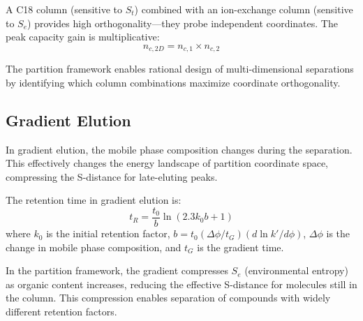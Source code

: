 \documentclass[twocolumn,superscriptaddress,prb,10pt]{revtex4-2}
\begin{document}
A C18 column (sensitive to $S_t$) combined with an ion-exchange column (sensitive to $S_e$) provides high orthogonality—they probe independent coordinates. The peak capacity gain is multiplicative:
\begin{equation}
n_{c,2D} = n_{c,1} \times n_{c,2}
\label{eq:peak_capacity_2d}
\end{equation}

The partition framework enables rational design of multi-dimensional separations by identifying which column combinations maximize coordinate orthogonality.

\subsection{Gradient Elution}

In gradient elution, the mobile phase composition changes during the separation. This effectively changes the energy landscape of partition coordinate space, compressing the S-distance for late-eluting peaks.

The retention time in gradient elution is:
\begin{equation}
t_R = \frac{t_0}{b} \ln\left(2.3 k_0 b + 1\right)
\label{eq:gradient_retention}
\end{equation}
where $k_0$ is the initial retention factor, $b = t_0 (\Delta\phi / t_G)(d\ln k' / d\phi)$, $\Delta\phi$ is the change in mobile phase composition, and $t_G$ is the gradient time.

In the partition framework, the gradient compresses $S_e$ (environmental entropy) as organic content increases, reducing the effective S-distance for molecules still in the column. This compression enables separation of compounds with widely different retention factors.
\end{document}
